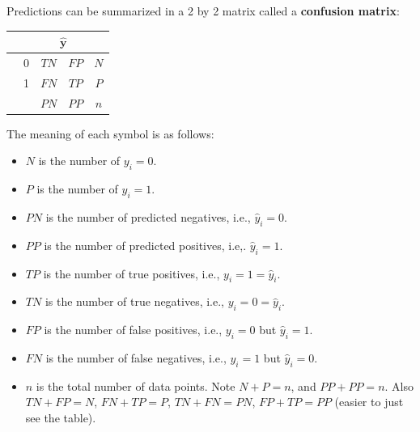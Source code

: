 \documentclass[12pt, a4paper]{article}
\theoremstyle{definition}
\begin{document}
	Predictions can be summarized in a 2 by 2 matrix called a \textbf{confusion matrix}:
	\begin{center}
		\begin{tabular}{c|c|cc|c}
			{} & \multicolumn{4}{c}{$\hat{\bm{y}}$}\\
			\hline
			\multirow{3}{*}{\rotatebox[origin=c]{90}{$\bm{y}$}}
			{} & 0  & $TN$ & $FP$ & $N$\\
			{} & 1  & $FN$ & $TP$ & $P$\\
			\hline
			{} & {} & $PN$ & $PP$ & $n$
		\end{tabular}
	\end{center}
	The meaning of each symbol is as follows:
	\begin{itemize}
		\item $N$ is the number of $y_i = 0$.
		\item $P$ is the number of $y_i = 1$.
		\item $PN$ is the number of predicted negatives, i.e., $\hat{y}_i=0$.
		\item $PP$ is the number of predicted positives, i.e,. $\hat{y}_i=1$.
		\item $TP$ is the number of true positives, i.e., $y_i=1=\hat{y}_i$.
		\item $TN$ is the number of true negatives, i.e., $y_i=0=\hat{y}_i$.
		\item $FP$ is the number of false positives, i.e., $y_i = 0$ but $\hat{y}_i = 1$.
		\item $FN$ is the number of false negatives, i.e., $y_i = 1$ but $\hat{y}_i = 0$.
		\item $n$ is the total number of data points. Note $N + P = n$, and $PP+PP=n$.
		Also $TN+FP=N$, $FN+TP=P$, $TN+FN=PN$, $FP+TP=PP$ (easier to just see the table).
	\end{itemize}
\end{document}
